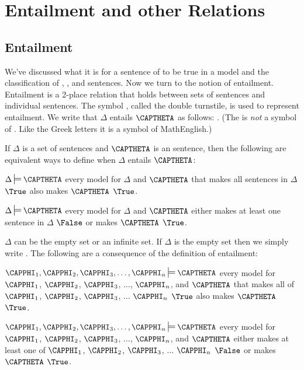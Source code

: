 \section{Entailment and other Relations}

\subsection{Entailment}\label{Entailment}
We've discussed what it is for a sentence of \GSL{} to be true in a model and the classification of , , and  sentences. 
Now we turn to the notion of entailment. 
Entailment is a 2-place relation that holds between sets of sentences and individual sentences.  The symbol \mention{$\:\sdtstile{}{}\:$}, called the double turnstile,\index{$\sdtstile{}{}$} is used to represent entailment. 
We write that $\Delta$ entails $\CAPTHETA$ as follows: \mention{\:$\Delta\sdtstile{}{}\CAPTHETA\:$}. 
(The \mention{\:$\sdtstile{}{}\:$} is \emph{not} a symbol of \GSL{}. 
Like the Greek letters it is a symbol of MathEnglish.)

\begin{majorILnc}{}
	If $\Delta$ is a set of \GSL{} sentences and $\CAPTHETA$ is an \GSL{} sentence, then the following are equivalent ways to define when $\Delta$ entails $\CAPTHETA$:
	\begin{cenumerate}
		\item $\Delta\sdtstile{}{}\CAPTHETA$ \Iff every model for $\Delta$ and $\CAPTHETA$ that makes all sentences in $\Delta$ $\True$ also makes $\CAPTHETA$ $\True$.
		\item $\Delta\sdtstile{}{}\CAPTHETA$ \Iff every model for $\Delta$ and $\CAPTHETA$ either makes at least one sentence in $\Delta$ $\False$ or makes $\CAPTHETA$ $\True$.
	\end{cenumerate}
\end{majorILnc}

\noindent{}$\Delta$ can be the empty set or an infinite set. 
If $\Delta$ is the empty set then we simply write \mention{$\:\sdtstile{}{}\CAPTHETA$}. The following are a consequence of the definition of entailment:

\begin{cenumerate}
		\item $\CAPPHI_1,\CAPPHI_2,\CAPPHI_3,\ldots,\CAPPHI_{\integer{n}}\sdtstile{}{}\CAPTHETA$ \Iff every model for $\CAPPHI_1$, $\CAPPHI_2$, $\CAPPHI_3$, $\ldots$, $\CAPPHI_{\integer{n}}$, and $\CAPTHETA$ that makes all of $\CAPPHI_1$, $\CAPPHI_2$, $\CAPPHI_3$, $\ldots$ $\CAPPHI_{\integer{n}}$ $\True$ also makes $\CAPTHETA$ $\True$.
		\item $\CAPPHI_1,\CAPPHI_2,\CAPPHI_3,\ldots,\CAPPHI_{\integer{n}}\sdtstile{}{}\CAPTHETA$ \Iff every model for $\CAPPHI_1$, $\CAPPHI_2$, $\CAPPHI_3$, $\ldots$, $\CAPPHI_{\integer{n}}$, and $\CAPTHETA$ either makes at least one of $\CAPPHI_1$, $\CAPPHI_2$, $\CAPPHI_3$, $\ldots$ $\CAPPHI_{\integer{n}}$ $\False$ or makes $\CAPTHETA$ $\True$.
\end{cenumerate}


